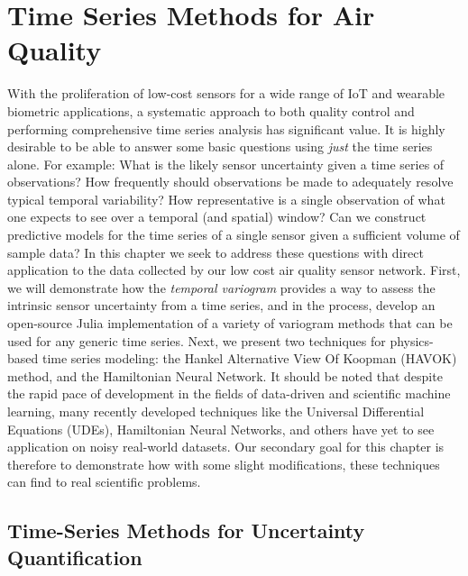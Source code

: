 \chapter{Time Series Methods for Air Quality}

With the proliferation of low-cost sensors for a wide range of IoT and wearable biometric applications, a systematic approach to both quality control and performing comprehensive time series analysis has significant value. It is highly desirable to be able to answer some basic questions using \textit{just} the time series alone. For example: What is the likely sensor uncertainty given a time series of observations? How frequently should observations be made to adequately resolve typical temporal variability? How representative is a single observation of what one expects to see over a temporal (and spatial) window? Can we construct predictive models for the time series of a single sensor given a sufficient volume of sample data? In this chapter we seek to address these questions with direct application to the data collected by our low cost air quality sensor network. First, we will demonstrate how the \textit{temporal variogram} provides a way to assess the intrinsic sensor uncertainty from a time series, and in the process, develop an open-source Julia implementation of a variety of variogram methods that can be used for any generic time series. Next, we present two techniques for physics-based time series modeling: the Hankel Alternative View Of Koopman (HAVOK) method, and the Hamiltonian Neural Network. It should be noted that despite the rapid pace of development in the fields of data-driven and scientific machine learning, many recently developed techniques like the Universal Differential Equations (UDEs), Hamiltonian Neural Networks, and others have yet to see application on noisy real-world datasets. Our secondary goal for this chapter is therefore to demonstrate how with some slight modifications, these techniques can find to real scientific problems.



\section{Time-Series Methods for Uncertainty Quantification}

